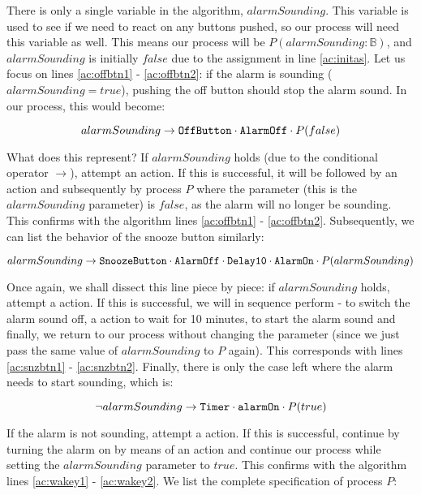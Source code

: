 There is only a single variable in the algorithm, $alarmSounding$. This variable is used to see if we need to react on any buttons pushed, so our process will need this variable as well. This means our process will be $P(alarmSounding: \mathds{B})$, and $alarmSounding$ is initially $false$ due to the assignment in line \ref{ac:initas}. Let us focus on lines \ref{ac:offbtn1} - \ref{ac:offbtn2}: if the alarm is sounding ($alarmSounding = true$), pushing the off button should stop the alarm sound. In our process, this would become:

\begin{displaymath} alarmSounding \rightarrow \texttt{OffButton} \cdot \texttt{AlarmOff} \cdot P(false) \end{displaymath}

What does this represent? If $alarmSounding$ holds (due to the conditional operator $\rightarrow$), attempt an  action. If this is successful, it will be followed by an  action and subsequently by process $P$ where the parameter (this is the $alarmSounding$ parameter) is $false$, as the alarm will no longer be sounding. This confirms with the algorithm lines \ref{ac:offbtn1} - \ref{ac:offbtn2}. Subsequently, we can list the behavior of the snooze button similarly:

\begin{displaymath} alarmSounding \rightarrow \texttt{SnoozeButton} \cdot \texttt{AlarmOff} \cdot \texttt{Delay10} \cdot \texttt{AlarmOn} \cdot P(alarmSounding) \end{displaymath}

Once again, we shall dissect this line piece by piece: if $alarmSounding$ holds, attempt a  action. If this is successful, we will in sequence perform  - to switch the alarm sound off, a  action to wait for 10 minutes,  to start the alarm sound and finally, we return to our process without changing the parameter (since we just pass the same value of $alarmSounding$ to $P$ again). This corresponds with lines \ref{ac:snzbtn1} - \ref{ac:snzbtn2}. Finally, there is only the case left where the alarm needs to start sounding, which is:

\begin{displaymath} \lnot alarmSounding \rightarrow \texttt{Timer} \cdot \texttt{alarmOn} \cdot P(true) \end{displaymath}

If the alarm is not sounding, attempt a  action. If this is successful, continue by turning the alarm on by means of an  action and continue our process while setting the $alarmSounding$ parameter to $true$. This confirms with the algorithm lines \ref{ac:wakey1} - \ref{ac:wakey2}. We list the complete specification of process $P$:

